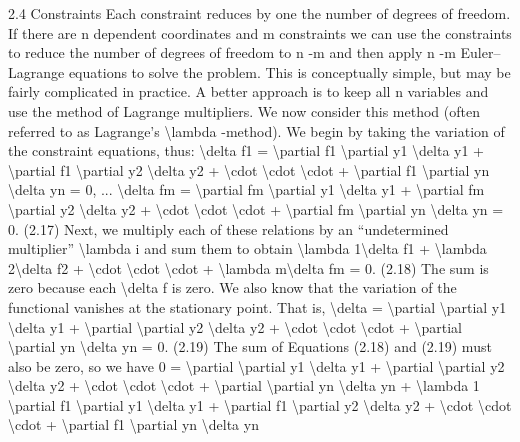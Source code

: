 2.4
Constraints
Each constraint reduces by one the number of degrees of freedom. If there
are n dependent coordinates and m constraints we can use the constraints to
reduce the number of degrees of freedom to n -m and then apply n -m
Euler--Lagrange equations to solve the problem. This is conceptually simple,
but may be fairly complicated in practice. A better approach is to keep all n
variables and use the method of Lagrange multipliers. We now consider this
method (often referred to as Lagrange's \textbackslash{}lambda -method). We begin by taking the
variation of the constraint equations, thus:
\textbackslash{}delta f1 = \textbackslash{}partial f1
\textbackslash{}partial y1
\textbackslash{}delta y1 + \textbackslash{}partial f1
\textbackslash{}partial y2
\textbackslash{}delta y2 + \textbackslash{}cdot  \textbackslash{}cdot  \textbackslash{}cdot  + \textbackslash{}partial f1
\textbackslash{}partial yn
\textbackslash{}delta yn = 0,
...
\textbackslash{}delta fm = \textbackslash{}partial fm
\textbackslash{}partial y1
\textbackslash{}delta y1 + \textbackslash{}partial fm
\textbackslash{}partial y2
\textbackslash{}delta y2 + \textbackslash{}cdot  \textbackslash{}cdot  \textbackslash{}cdot  + \textbackslash{}partial fm
\textbackslash{}partial yn
\textbackslash{}delta yn = 0.
(2.17)
Next, we multiply each of these relations by an ``undetermined multiplier'' \textbackslash{}lambda i
and sum them to obtain
\textbackslash{}lambda 1\textbackslash{}delta f1 + \textbackslash{}lambda 2\textbackslash{}delta f2 + \textbackslash{}cdot  \textbackslash{}cdot  \textbackslash{}cdot  + \textbackslash{}lambda m\textbackslash{}delta fm = 0.
(2.18)
The sum is zero because each \textbackslash{}delta f is zero.
We also know that the variation of the functional  vanishes at the stationary
point. That is,
\textbackslash{}delta  = \textbackslash{}partial
\textbackslash{}partial y1
\textbackslash{}delta y1 + \textbackslash{}partial
\textbackslash{}partial y2
\textbackslash{}delta y2 + \textbackslash{}cdot  \textbackslash{}cdot  \textbackslash{}cdot  + \textbackslash{}partial
\textbackslash{}partial yn
\textbackslash{}delta yn = 0.
(2.19)
The sum of Equations (2.18) and (2.19) must also be zero, so we have
0 = \textbackslash{}partial
\textbackslash{}partial y1
\textbackslash{}delta y1 + \textbackslash{}partial
\textbackslash{}partial y2
\textbackslash{}delta y2 + \textbackslash{}cdot  \textbackslash{}cdot  \textbackslash{}cdot  + \textbackslash{}partial
\textbackslash{}partial yn
\textbackslash{}delta yn
+ \textbackslash{}lambda 1
\textbackslash{}partial f1
\textbackslash{}partial y1
\textbackslash{}delta y1 + \textbackslash{}partial f1
\textbackslash{}partial y2
\textbackslash{}delta y2 + \textbackslash{}cdot  \textbackslash{}cdot  \textbackslash{}cdot  + \textbackslash{}partial f1
\textbackslash{}partial yn
\textbackslash{}delta yn

